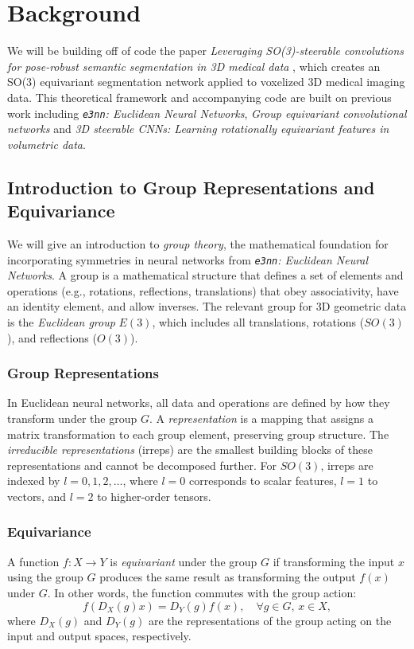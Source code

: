 \documentclass[letterpaper]{article}
\begin{document}
\section{Background}
We will be building off of code the paper \emph{Leveraging SO(3)-steerable convolutions for pose-robust semantic segmentation in 3D medical data} \cite{e3nn_medical}, which creates an SO(3) equivariant segmentation network applied to voxelized 3D medical imaging data. This theoretical framework and accompanying code are built on previous work including \emph{\texttt{e3nn}: Euclidean Neural Networks}\cite{geiger2022e3nn}, \emph{Group equivariant convolutional networks}\cite{cohen2016group} and \emph{3D steerable CNNs: Learning rotationally equivariant features in volumetric data}\cite{weiler2018steerable}.

\subsection{Introduction to Group Representations and Equivariance}
We will give an introduction to \textit{group theory}, the mathematical foundation for incorporating symmetries in neural networks from \emph{\texttt{e3nn}: Euclidean Neural Networks}\cite{geiger2022e3nn}.
A group is a mathematical structure that defines a set of elements and operations (e.g., rotations, reflections, translations) that obey associativity, have an identity element, and allow inverses. The relevant group for 3D geometric data is the \textit{Euclidean group} \(E(3)\), which includes all translations, rotations (\(SO(3)\)), and reflections (\(O(3)\)).

\subsubsection{Group Representations}
In Euclidean neural networks, all data and operations are defined by how they transform under the group \(G\). A \textit{representation} is a mapping that assigns a matrix transformation to each group element, preserving group structure. The \textit{irreducible representations} (irreps) are the smallest building blocks of these representations and cannot be decomposed further. For \(SO(3)\), irreps are indexed by \(l = 0, 1, 2, \ldots\), where \(l = 0\) corresponds to scalar features, \(l = 1\) to vectors, and \(l = 2\) to higher-order tensors.

\subsubsection{Equivariance}
A function \(f: X \to Y\) is \textit{equivariant} under the group \(G\) if transforming the input \(x\) using the group \(G\) produces the same result as transforming the output \(f(x)\) under \(G\). In other words, the function commutes with the group action:
\[
f(D_X(g)x) = D_Y(g)f(x), \quad \forall g \in G, \, x \in X,
\]
where \(D_X(g)\) and \(D_Y(g)\) are the representations of the group acting on the input and output spaces, respectively.
\end{document}

